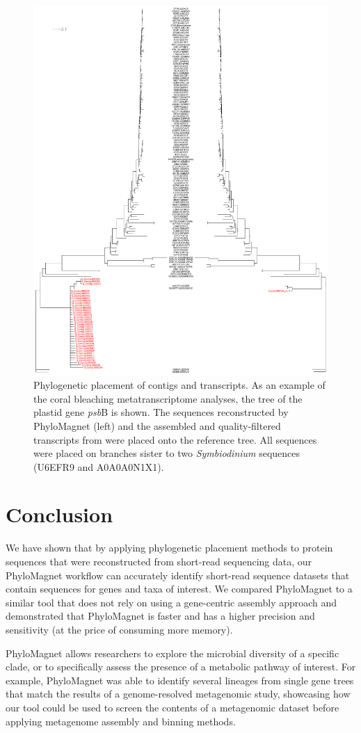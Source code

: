 \documentclass{bioinfo}
\begin{document}
\begin{figure}[!tpb]%
\centerline{\includegraphics[width=.6\textwidth]{Fig4.pdf}}
\caption{Phylogenetic placement of contigs and transcripts. As an example of the coral bleaching metatranscriptome analyses, the tree of the plastid gene \textit{psb}B is shown. The sequences reconstructed by PhyloMagnet (left) and the assembled and quality-filtered transcripts from \citet[][right]{Frazier2017} were placed onto the reference tree. All sequences were placed on branches sister to two \textit{Symbiodinium} sequences (U6EFR9 and A0A0A0N1X1).}\label{fig:04}
\end{figure}

\section{Conclusion}
We have shown that by applying phylogenetic placement methods to protein sequences that were reconstructed from short-read sequencing data, our PhyloMagnet workflow can accurately identify short-read sequence datasets that contain sequences for genes and taxa of interest. We compared PhyloMagnet to a similar tool that does not rely on using a gene-centric assembly approach and demonstrated that PhyloMagnet is faster and has a higher precision and sensitivity (at the price of consuming more memory). 

PhyloMagnet allows researchers to explore the microbial diversity of a specific clade, or to specifically assess the presence of a metabolic pathway of interest. For example, PhyloMagnet was able to identify several lineages from single gene trees that match the results of a genome-resolved metagenomic study, showcasing how our tool could be used to screen the contents of a metagenomic dataset before applying metagenome assembly and binning methods.
\end{document}
